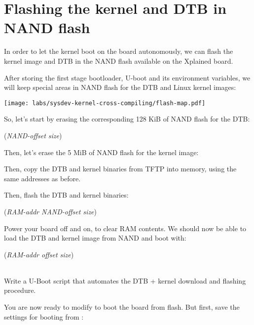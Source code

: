 \section{Flashing the kernel and DTB in NAND flash}

In order to let the kernel boot on the board autonomously, we can
flash the kernel image and DTB in the NAND flash available on the
Xplained board.

After storing the first stage bootloader, U-boot and its environment
variables, we will keep special areas in NAND flash for the DTB
and Linux kernel images:

\begin{center}
  \texttt{[image: labs/sysdev-kernel-cross-compiling/flash-map.pdf]}
\end{center}

So, let's start by erasing the corresponding 128 KiB of NAND flash
for the DTB:


 ({\em NAND-offset size})

Then, let's erase the 5 MiB of NAND flash for the kernel image:


Then, copy the DTB and kernel binaries from TFTP into memory, using the
same addresses as before.

Then, flash the DTB and kernel binaries:

 ({\em RAM-addr NAND-offset size})\\

Power your board off and on, to clear RAM contents. We should now be
able to load the DTB and kernel image from NAND and boot with:

 ({\em RAM-addr offset size})\\
\\

Write a U-Boot script that automates the DTB + kernel download
and flashing procedure.

You are now ready to modify  to boot the board
from flash. But first, save the settings for booting from :

